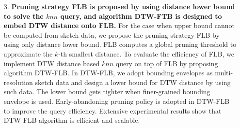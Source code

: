\begin{itemize}
\item [3.] \textbf{Pruning strategy FLB is proposed  by  using distance lower bound  to  solve the $knn$ query, and  algorithm DTW-FTB is designed to embed DTW distance onto FLB.} For the case when upper bound cannot be computed from sketch data, we propose the pruning strategy FLB by using only distance lower bound. FLB computes a global pruning threshold to approximate the $k$-th smallest distance.
To evaluate the efficiency  of FLB, we implement  DTW distance based $knn$ query  on top of FLB by proposing algorithm DTW-FLB. In DTW-FLB, we adopt bounding envelopes as multi-resolution sketch data and design a lower bound for DTW distance by using such data. The lower bound gets tighter when finer-grained bounding envelope is used.
 Early-abandoning pruning policy is  adopted in DTW-FLB to improve the query efficiency.
 Extensive experimental results  show that DTW-FLB  algorithm is efficient and scalable.
%
%

\end{itemize}
